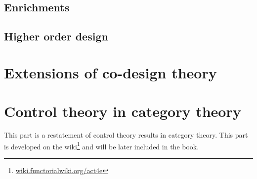 {\chapter{Enrichments}

\clearpage

\chapter{Higher order design}

\clearpage


\part{Extensions of co-design theory}


}



\part{Control theory in category theory}

This part is a restatement of control theory results in category theory.
This part is developed on the wiki\footnote{\href{https://wiki.functorialwiki.org/act4e/}{wiki.functorialwiki.org/act4e}} and will be later included in the book.

%
%
%
%
\printbibliography